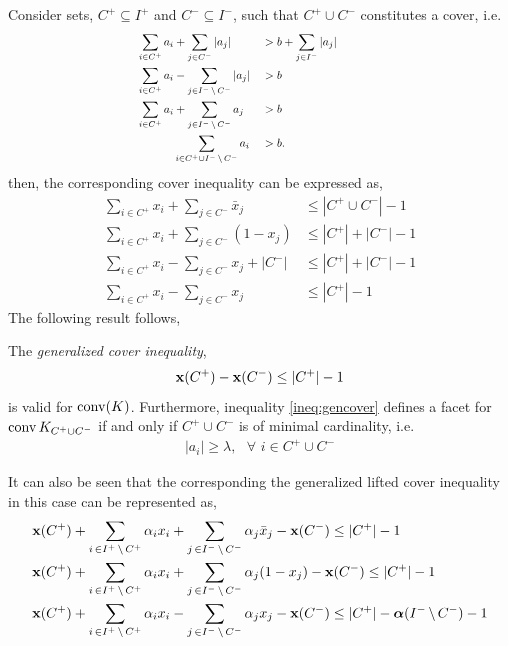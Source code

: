 \documentclass[10pt,twoside]{amsart}
\begin{document}
Consider sets, $C^+ \subseteq I^+$ and $C^- \subseteq I^-$, such that $C^+ \cup C^-$ constitutes a cover, i.e.
\begin{align*}
  \hspace*{4cm}\sum_{i\in C^+} a_i &+ \sum_{j\in C^-} |a_j| & & > b + \sum_{j\in I^-} |a_j| &\hspace*{5cm}\\
  \hspace*{4cm}\sum_{i\in C^+} a_i &- \sum_{j\in I^-\sm C^-} |a_j| & & > b &\hspace*{5cm}\\
  \hspace*{4cm}\sum_{i\in C^+} a_i &+ \sum_{j\in I^-\sm C^-} a_j & & > b &\hspace*{5cm}\\
  \hspace*{4cm}&\sum_{i\in C^+\cup I^-\sm C^-} a_i & & > b. &\hspace*{5cm}\\
\end{align*}
then, the corresponding cover inequality can be expressed as,
\begin{align*}
    \sum_{i\in C^+} x_i + \sum_{j\in C^-} \bar{x}_j & \leq |C^+ \cup C^-| - 1\\
    \sum_{i\in C^+} x_i + \sum_{j\in C^-} (1 - {x}_j) & \leq |C^+| + |C^-| - 1\\
    \sum_{i\in C^+} x_i - \sum_{j\in C^-} x_j + |C^-| & \leq |C^+| + |C^-| - 1\\
    \sum_{i\in C^+} x_i - \sum_{j\in C^-} x_j  & \leq |C^+| - 1
\end{align*}
The following result follows,
\begin{prop}
  The \emph{generalized cover inequality},
    \begin{align}
    \label{ineq:gencover}
      \mathbf{x}(C^+) - \mathbf{x}(C^-) \leq |C^+| - 1
    \end{align}
  is valid for $\operatorname{conv}(K)$. Furthermore, inequality \eqref{ineq:gencover} defines a facet for $\operatorname{conv}{K_{C^+ \cup C^-}}$ if and only if $C^+\cup C^-$ is of minimal cardinality, i.e.
  \begin{align*}
    |a_i| \geq \lambda,\,\,\,\, \forall\,\, i \in C^+\cup C^-
  \end{align*}
\end{prop}
It can also be seen that the corresponding the generalized lifted cover inequality in this case can be represented as,
\begin{align*}
        &\mathbf{x}(C^+) + \sum_{i\,\in I^+\,\backslash\, C^+} \alpha_i x_i + \sum_{j\,\in I^-\,\backslash\, C^-} \alpha_j \bar{x}_j- \mathbf{x}(C^-) \leq |C^+| - 1\\
        &\mathbf{x}(C^+) + \sum_{i\,\in I^+\,\backslash\, C^+} \alpha_i x_i + \sum_{j\,\in I^-\,\backslash\, C^-} \alpha_j (1-{x}_j) - \mathbf{x}(C^-) \leq |C^+| - 1\\
        &\mathbf{x}(C^+) + \sum_{i\,\in I^+\,\backslash\, C^+} \alpha_i x_i - \sum_{j\,\in I^-\,\backslash\, C^-} \alpha_j x_j - \mathbf{x}(C^-) \leq |C^+| - \boldsymbol\alpha(I^-\,\backslash\, C^-) - 1
\end{align*}
\end{document}
